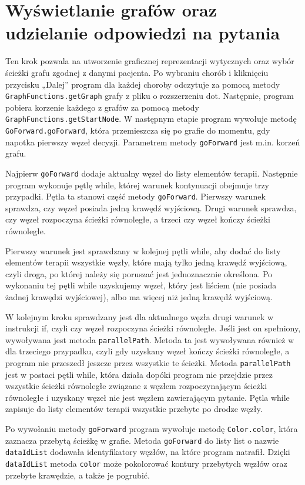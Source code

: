 \section{Wyświetlanie grafów oraz udzielanie odpowiedzi na pytania}
Ten krok pozwala na utworzenie graficznej reprezentacji wytycznych oraz wybór ścieżki grafu zgodnej z danymi pacjenta. Po wybraniu chorób i kliknięciu przycisku „Dalej” program dla każdej choroby odczytuje za pomocą metody \texttt{GraphFunctions.getGraph} grafy z pliku o rozszerzeniu dot. Następnie, program pobiera korzenie każdego z grafów za pomocą metody \texttt{GraphFunctions.get\-StartNode}. W następnym etapie program wywołuje metodę \texttt{GoForward.goForward}, która przemieszcza się po grafie do momentu, gdy napotka pierwszy węzeł decyzji. Parametrem metody \texttt{goForward} jest m.in. korzeń grafu.

Najpierw \texttt{goForward} dodaje aktualny węzeł do listy elementów terapii. Następnie program wykonuje pętlę while, której warunek kontynuacji obejmuje trzy przypadki. Pętla ta stanowi część metody \texttt{goForward}. Pierwszy warunek sprawdza, czy węzeł posiada jedną krawędź wyjściową. Drugi warunek sprawdza, czy węzeł rozpoczyna ścieżki równoległe, a trzeci czy węzeł kończy ścieżki równoległe. 

Pierwszy warunek jest sprawdzany w kolejnej pętli while, aby dodać do listy elementów terapii wszystkie węzły, które mają tylko jedną krawędź wyjściową, czyli droga, po której należy się poruszać jest jednoznacznie określona. 
Po wykonaniu tej pętli while uzyskujemy węzeł, który jest liściem (nie posiada żadnej krawędzi wyjściowej), albo ma więcej niż jedną krawędź wyjściową.

W kolejnym kroku sprawdzany jest dla aktualnego węzła drugi warunek w instrukcji if, czyli czy węzeł rozpoczyna ścieżki równoległe. Jeśli jest on spełniony, wywoływana jest metoda \texttt{parallel\-Path}. Metoda ta jest wywoływana również w dla trzeciego przypadku, czyli gdy uzyskany węzeł kończy ścieżki równoległe, a program nie przeszedł jeszcze przez wszystkie te ścieżki. Metoda \texttt{parallel\-Path} jest w postaci pętli while, która działa dopóki program nie przejdzie przez wszystkie ścieżki równoległe związane z węzłem rozpoczynającym ścieżki równoległe i uzyskany węzeł nie jest węzłem zawierającym pytanie. Pętla while zapisuje do listy elementów terapii wszystkie przebyte po drodze węzły.  

Po wywołaniu metody \texttt{goForward} program wywołuje metodę \texttt{Color.color}, która zaznacza przebytą ścieżkę w grafie. Metoda \texttt{goForward} do listy list o nazwie \texttt{dataIdList} dodawała identyfikatory węzłów, na które program natrafił. Dzięki \texttt{dataIdList} metoda \texttt{color} może pokolorować kontury przebytych węzłów oraz przebyte krawędzie, a także je pogrubić. 
 
